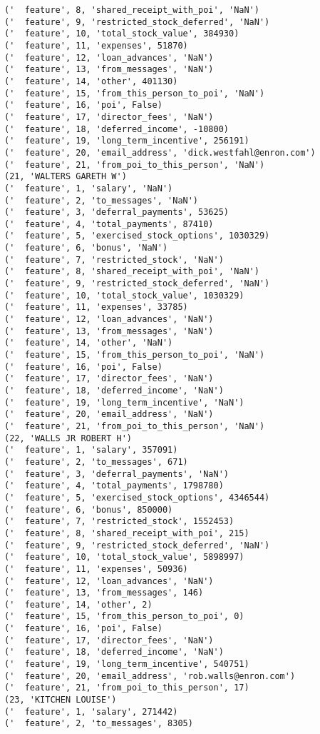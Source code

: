 \begin{verbatim}
('  feature', 8, 'shared_receipt_with_poi', 'NaN')
('  feature', 9, 'restricted_stock_deferred', 'NaN')
('  feature', 10, 'total_stock_value', 384930)
('  feature', 11, 'expenses', 51870)
('  feature', 12, 'loan_advances', 'NaN')
('  feature', 13, 'from_messages', 'NaN')
('  feature', 14, 'other', 401130)
('  feature', 15, 'from_this_person_to_poi', 'NaN')
('  feature', 16, 'poi', False)
('  feature', 17, 'director_fees', 'NaN')
('  feature', 18, 'deferred_income', -10800)
('  feature', 19, 'long_term_incentive', 256191)
('  feature', 20, 'email_address', 'dick.westfahl@enron.com')
('  feature', 21, 'from_poi_to_this_person', 'NaN')
(21, 'WALTERS GARETH W')
('  feature', 1, 'salary', 'NaN')
('  feature', 2, 'to_messages', 'NaN')
('  feature', 3, 'deferral_payments', 53625)
('  feature', 4, 'total_payments', 87410)
('  feature', 5, 'exercised_stock_options', 1030329)
('  feature', 6, 'bonus', 'NaN')
('  feature', 7, 'restricted_stock', 'NaN')
('  feature', 8, 'shared_receipt_with_poi', 'NaN')
('  feature', 9, 'restricted_stock_deferred', 'NaN')
('  feature', 10, 'total_stock_value', 1030329)
('  feature', 11, 'expenses', 33785)
('  feature', 12, 'loan_advances', 'NaN')
('  feature', 13, 'from_messages', 'NaN')
('  feature', 14, 'other', 'NaN')
('  feature', 15, 'from_this_person_to_poi', 'NaN')
('  feature', 16, 'poi', False)
('  feature', 17, 'director_fees', 'NaN')
('  feature', 18, 'deferred_income', 'NaN')
('  feature', 19, 'long_term_incentive', 'NaN')
('  feature', 20, 'email_address', 'NaN')
('  feature', 21, 'from_poi_to_this_person', 'NaN')
(22, 'WALLS JR ROBERT H')
('  feature', 1, 'salary', 357091)
('  feature', 2, 'to_messages', 671)
('  feature', 3, 'deferral_payments', 'NaN')
('  feature', 4, 'total_payments', 1798780)
('  feature', 5, 'exercised_stock_options', 4346544)
('  feature', 6, 'bonus', 850000)
('  feature', 7, 'restricted_stock', 1552453)
('  feature', 8, 'shared_receipt_with_poi', 215)
('  feature', 9, 'restricted_stock_deferred', 'NaN')
('  feature', 10, 'total_stock_value', 5898997)
('  feature', 11, 'expenses', 50936)
('  feature', 12, 'loan_advances', 'NaN')
('  feature', 13, 'from_messages', 146)
('  feature', 14, 'other', 2)
('  feature', 15, 'from_this_person_to_poi', 0)
('  feature', 16, 'poi', False)
('  feature', 17, 'director_fees', 'NaN')
('  feature', 18, 'deferred_income', 'NaN')
('  feature', 19, 'long_term_incentive', 540751)
('  feature', 20, 'email_address', 'rob.walls@enron.com')
('  feature', 21, 'from_poi_to_this_person', 17)
(23, 'KITCHEN LOUISE')
('  feature', 1, 'salary', 271442)
('  feature', 2, 'to_messages', 8305)

\end{verbatim}
